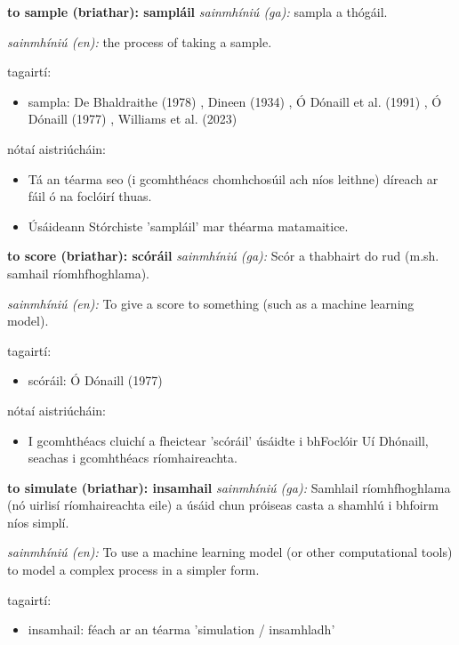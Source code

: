 \documentclass{article}
\begin{document}
\textbf{to sample (briathar): sampláil}
\textit{sainmhíniú (ga):} sampla a thógáil.

\textit{sainmhíniú (en):} the process of taking a sample.

tagairtí:
\begin{itemize}
	\item sampla: De Bhaldraithe (1978) \cite{de-bhaldraithe}, Dineen (1934) \cite{dineen}, Ó Dónaill et al. (1991) \cite{focloir-beag}, Ó Dónaill (1977) \cite{odonaill}, Williams et al. (2023) \cite{storchiste}
\end{itemize}

nótaí aistriúcháin:
\begin{itemize}
	\item Tá an téarma seo (i gcomhthéacs chomhchosúil ach níos leithne) díreach ar fáil ó na foclóirí thuas.
	\item Úsáideann Stórchiste 'sampláil' mar théarma matamaitice.
\end{itemize}


\textbf{to score (briathar): scóráil}
\textit{sainmhíniú (ga):} Scór a thabhairt do rud (m.sh. samhail ríomhfhoghlama).

\textit{sainmhíniú (en):} To give a score to something (such as a machine learning model).

tagairtí:
\begin{itemize}
	\item scóráil: Ó Dónaill (1977) \cite{odonaill}
\end{itemize}

nótaí aistriúcháin:
\begin{itemize}
	\item I gcomhthéacs cluichí a fheictear 'scóráil' úsáidte i bhFoclóir Uí Dhónaill, seachas i gcomhthéacs ríomhaireachta.
\end{itemize}


\textbf{to simulate (briathar): insamhail}
\textit{sainmhíniú (ga):} Samhlail ríomhfhoghlama (nó uirlisí ríomhaireachta eile) a úsáid chun próiseas casta a shamhlú i bhfoirm níos simplí.

\textit{sainmhíniú (en):} To use a machine learning model (or other computational tools) to model a complex process in a simpler form.

tagairtí:
\begin{itemize}
	\item insamhail: féach ar an téarma 'simulation / insamhladh'
\end{itemize}
\end{document}
